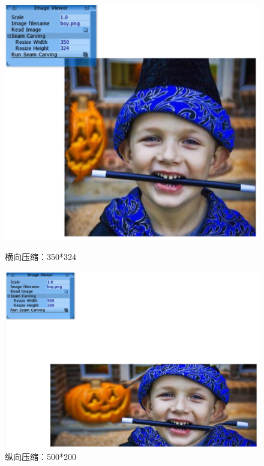 \documentclass{article}
\begin{document}
\begin{figure}[htbp]
    \centering
    \begin{minipage}[t]{0.4\linewidth}
      \centering
      \includegraphics[width=\linewidth]{1.png}
      \caption{横向压缩：350*324}
      \label{fig:image1}
    \end{minipage}
    \hfill
    \begin{minipage}[t]{0.4\linewidth}
      \centering
      \includegraphics[width=\linewidth]{2.png}
      \caption{纵向压缩：500*200}
      \label{fig:image2}
    \end{minipage}


\end{figure}
\end{document}
